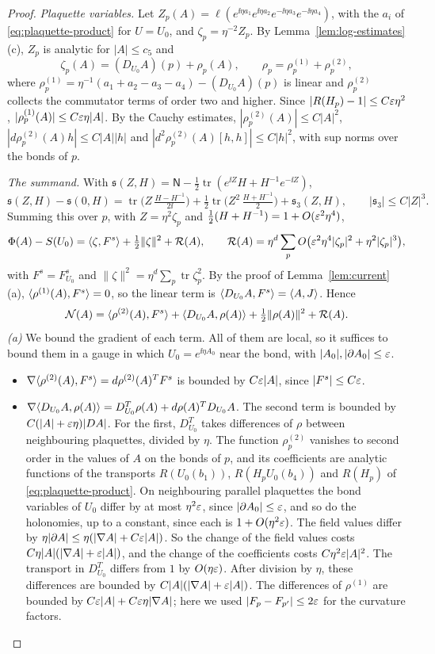 \begin{proof}
\emph{Plaquette variables.} Let $Z_p(A)=\ell(e^{\ii\eta a_1}e^{\ii\eta a_2}e^{-\ii\eta a_3}e^{-\ii\eta a_4})$, with the $a_i$ of \eqref{eq:plaquette-product} for $U=U_0$, and $\zeta_p=\eta^{-2}Z_p$. By Lemma~\ref{lem:log-estimates}(c), $Z_p$ is analytic for $|A|\le c_5$ and
\[
\zeta_p(A)=(D_{U_0}A)(p)+\rho_p(A),\qquad\rho_p=\rho_p^{(1)}+\rho_p^{(2)},
\]
where $\rho^{(1)}_p=\eta^{-1}(a_1+a_2-a_3-a_4)-(D_{U_0}A)(p)$ is linear and $\rho^{(2)}_p$ collects the commutator terms of order two and higher. Since $|R(H_p)-1|\le C\varepsilon\eta^2$, $|\rho^{(1)}_p(A)|\le C\varepsilon\eta|A|$. By the Cauchy estimates, $|\rho^{(2)}_p(A)|\le C|A|^2$, $|d\rho^{(2)}_p(A)h|\le C|A||h|$ and $|d^2\rho^{(2)}_p(A)[h,h]|\le C|h|^2$, with sup norms over the bonds of $p$.

\emph{The summand.} With $\mathfrak s(Z,H)=\mathsf N-\frac12\operatorname{tr}(e^{\ii Z}H+H^{-1}e^{-\ii Z})$,
\[
\mathfrak s(Z,H)-\mathfrak s(0,H)=\operatorname{tr}\Big(Z\,\tfrac{H-H^{-1}}{2\ii}\Big)+\tfrac12\operatorname{tr}\Big(Z^2\,\tfrac{H+H^{-1}}2\Big)+\mathfrak s_3(Z,H),\qquad|\mathfrak s_3|\le C|Z|^3 .
\]
Summing this over $p$, with $Z=\eta^2\zeta_p$ and $\frac12(H+H^{-1})=1+O(\varepsilon^2\eta^4)$,
\[
\Phi(A)-S(U_0)=\langle \zeta,F^s\rangle+\tfrac12\|\zeta\|^2+\mathcal R(A),\qquad\mathcal R(A)=\eta^d\sum_pO\big(\varepsilon^2\eta^4|\zeta_p|^2+\eta^2|\zeta_p|^3\big),
\]
with $F^s=F^s_{U_0}$ and $\|\zeta\|^2=\eta^d\sum_p\operatorname{tr}\zeta_p^2$. By the proof of Lemma~\ref{lem:current}(a), $\langle \rho^{(1)}(A),F^s\rangle=0$, so the linear term is $\langle D_{U_0}A,F^s\rangle=\langle A,J\rangle$. Hence
\[
\mathcal N(A)=\langle \rho^{(2)}(A),F^s\rangle+\langle D_{U_0}A,\rho(A)\rangle+\tfrac12\|\rho(A)\|^2+\mathcal R(A).
\]
\emph{(a)} We bound the gradient of each term. All of them are local, so it suffices to bound them in a gauge in which $U_0=e^{\ii\eta A_0}$ near the bond, with $|A_0|,|\partial A_0|\le\varepsilon$.
\begin{itemize}
\item $\nabla\langle \rho^{(2)}(A),F^s\rangle=d\rho^{(2)}(A)^TF^s$ is bounded by $C\varepsilon|A|$, since $|F^s|\le C\varepsilon$.
\item $\nabla\langle D_{U_0}A,\rho(A)\rangle=D_{U_0}^T\rho(A)+d\rho(A)^TD_{U_0}A$. The second term is bounded by $C(|A|+\varepsilon\eta)|DA|$. For the first, $D^T_{U_0}$ takes differences of $\rho$ between neighbouring plaquettes, divided by $\eta$. The function $\rho^{(2)}_p$ vanishes to second order in the values of $A$ on the bonds of $p$, and its coefficients are analytic functions of the transports $R(U_0(b_1))$, $R(H_pU_0(b_4))$ and $R(H_p)$ of \eqref{eq:plaquette-product}. On neighbouring parallel plaquettes the bond variables of $U_0$ differ by at most $\eta^2\varepsilon$, since $|\partial A_0|\le\varepsilon$, and so do the holonomies, up to a constant, since each is $1+O(\eta^2\varepsilon)$. The field values differ by $\eta|\partial A|\le\eta(|\nabla A|+C\varepsilon|A|)$. So the change of the field values costs $C\eta|A|(|\nabla A|+\varepsilon|A|)$, and the change of the coefficients costs $C\eta^2\varepsilon|A|^2$. The transport in $D^T_{U_0}$ differs from $1$ by $O(\eta\varepsilon)$. After division by $\eta$, these differences are bounded by $C|A|(|\nabla A|+\varepsilon|A|)$. The differences of $\rho^{(1)}$ are bounded by $C\varepsilon|A|+C\varepsilon\eta|\nabla A|$; here we used $|F_p-F_{p'}|\le2\varepsilon$ for the curvature factors.

\end{itemize}
\end{proof}
